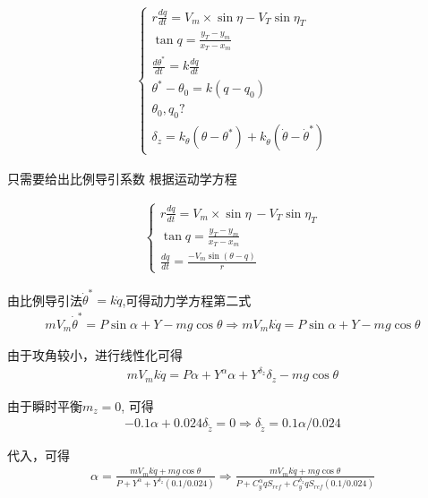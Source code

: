 \documentclass[UTF8]{ctexart}
\begin{document}



\begin{align}
    \begin{cases}
        r\frac{dq}{dt}=V_{m}\times\sin\eta-V_{T}\sin\eta_{T} \\
        \tan q=\frac{y_{T}-y_{m}}{x_{T}-x_{m}}               \\
        \frac{d\theta^*}{dt}=k\frac{dq}{dt}                  \\
        \theta^{*}-\theta_{0}=k(q-q_{0})                     \\
        \theta_{0},q_{0}?                                    \\
        \delta_{z}=k_{\theta}(\theta-\theta^{*})+k_{\dot{\theta}}(\dot{\theta}-\dot{\theta}^{*})
    \end{cases}
\end{align}


只需要给出比例导引系数
根据运动学方程

\begin{align}
    \begin{cases}
        r\frac{dq}{dt}=V_{m}\times\sin\eta\:-V_{T}\sin\eta_{T} \\
        \tan q=\frac{y_T-y_m}{x_T-x_m}                         \\
        \frac{dq}{dt} =\frac{-V_m\sin(\theta-q)}r
    \end{cases}
\end{align}

由比例导引法$\dot{\theta}^*=k\dot{q}$,可得动力学方程第二式
\begin{align}
    mV_m\dot{\theta}^*=P\sin\alpha+Y-mg\cos\theta\Rightarrow mV_mk\dot{q}=P\sin\alpha+Y-mg\cos\theta
\end{align}

由于攻角较小，进行线性化可得
\begin{align}
    mV_{m}k\dot{q}=P\alpha+Y^{\alpha}\alpha+Y^{\delta_{z}}\delta_{z}-mg\cos\theta
\end{align}

由于瞬时平衡$m_z=0$, 可得
\begin{align}
    -0.1\alpha+0.024\delta_{\tilde{z}}=0\Rightarrow\delta_{\tilde{z}}=0.1\alpha/0.024
\end{align}

代入，可得
\begin{align}
    \alpha=\frac{mV_{m}k\dot{q}+mg\cos\theta}{P+Y^{\alpha}+Y^{\delta_{z}}(0.1/0.024)}\Rightarrow\frac{mV_{m}k\dot{q}+mg\cos\theta}{P+C_{y}^{\alpha}qS_{ref}+C_{y}^{\delta_{z}}qS_{ref}(0.1/0.024)}
\end{align}
\end{document}
